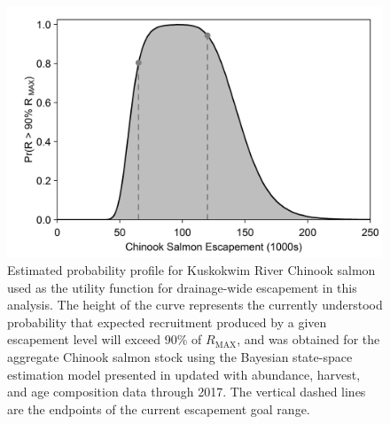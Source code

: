 \documentclass[12pt,]{book}
\theoremstyle{definition}
\theoremstyle{definition}
\theoremstyle{definition}
\theoremstyle{remark}
\begin{document}
\begin{singlespace}
\begin{figure}
  \centering
  \includegraphics{img/Ch3/R-max-profile.jpg}
  \caption{Estimated probability profile for Kuskokwim River Chinook salmon used as the utility function for drainage-wide escapement in this analysis. The height of the curve represents the currently understood probability that expected recruitment produced by a given escapement level will exceed 90\% of $R_{\text{MAX}}$, and was obtained for the aggregate Chinook salmon stock using the Bayesian state-space estimation model presented in \cite{hamazaki-etal-2012} updated with abundance, harvest, and age composition data through 2017. The vertical dashed lines are the endpoints of the current escapement goal range.}
  \label{fig:R-max-profile}
\end{figure}


\end{singlespace}
\end{document}
